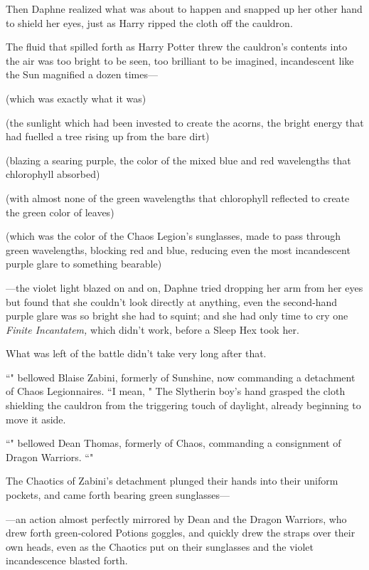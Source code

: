Then Daphne realized what was about to happen and snapped up her other hand to shield her eyes, just as Harry ripped the cloth off the cauldron.

The fluid that spilled forth as Harry Potter threw the cauldron's contents into the air was too bright to be seen, too brilliant to be imagined, incandescent like the Sun magnified a dozen times—

(which was exactly what it was)

(the sunlight which had been invested to create the acorns, the bright energy that had fuelled a tree rising up from the bare dirt)

(blazing a searing purple, the color of the mixed blue and red wavelengths that chlorophyll absorbed)

(with almost none of the green wavelengths that chlorophyll reflected to create the green color of leaves)

(which was the color of the Chaos Legion's sunglasses, made to pass through green wavelengths, blocking red and blue, reducing even the most incandescent purple glare to something bearable)

—the violet light blazed on and on, Daphne tried dropping her arm from her eyes but found that she couldn't look directly at anything, even the second-hand purple glare was so bright she had to squint; and she had only time to cry one \emph{Finite Incantatem,} which didn't work, before a Sleep Hex took her.

What was left of the battle didn't take very long after that.

\later

``" bellowed Blaise Zabini, formerly of Sunshine, now commanding a detachment of Chaos Legionnaires. ``I mean, " The Slytherin boy's hand grasped the cloth shielding the cauldron from the triggering touch of daylight, already beginning to move it aside.

``" bellowed Dean Thomas, formerly of Chaos, commanding a consignment of Dragon Warriors. ``"

The Chaotics of Zabini's detachment plunged their hands into their uniform pockets, and came forth bearing green sunglasses—

—an action almost perfectly mirrored by Dean and the Dragon Warriors, who drew forth green-colored Potions goggles, and quickly drew the straps over their own heads, even as the Chaotics put on their sunglasses and the violet incandescence blasted forth.

